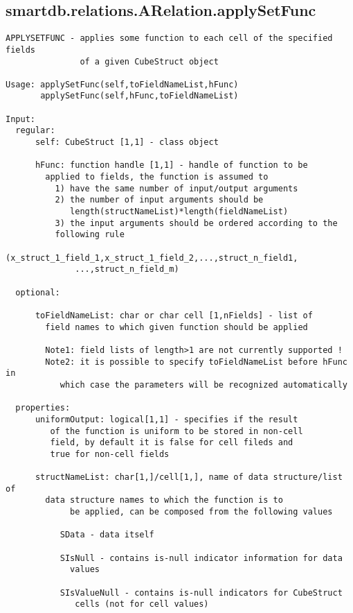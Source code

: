 \subsection{\texorpdfstring{smartdb.relations.ARelation.applySetFunc}{applySetFunc}}\label{method:smartdb.relations.ARelation.applySetFunc}
\begin{verbatim}
APPLYSETFUNC - applies some function to each cell of the specified fields
               of a given CubeStruct object

Usage: applySetFunc(self,toFieldNameList,hFunc)
       applySetFunc(self,hFunc,toFieldNameList)

Input:
  regular:
      self: CubeStruct [1,1] - class object

      hFunc: function handle [1,1] - handle of function to be
        applied to fields, the function is assumed to
          1) have the same number of input/output arguments
          2) the number of input arguments should be
             length(structNameList)*length(fieldNameList)
          3) the input arguments should be ordered according to the
          following rule
              (x_struct_1_field_1,x_struct_1_field_2,...,struct_n_field1,
              ...,struct_n_field_m)

  optional:

      toFieldNameList: char or char cell [1,nFields] - list of
        field names to which given function should be applied

        Note1: field lists of length>1 are not currently supported !
        Note2: it is possible to specify toFieldNameList before hFunc in
           which case the parameters will be recognized automatically

  properties:
      uniformOutput: logical[1,1] - specifies if the result
         of the function is uniform to be stored in non-cell
         field, by default it is false for cell fileds and
         true for non-cell fields

      structNameList: char[1,]/cell[1,], name of data structure/list of
        data structure names to which the function is to
             be applied, can be composed from the following values

           SData - data itself

           SIsNull - contains is-null indicator information for data
             values

           SIsValueNull - contains is-null indicators for CubeStruct
              cells (not for cell values)


\end{verbatim}
